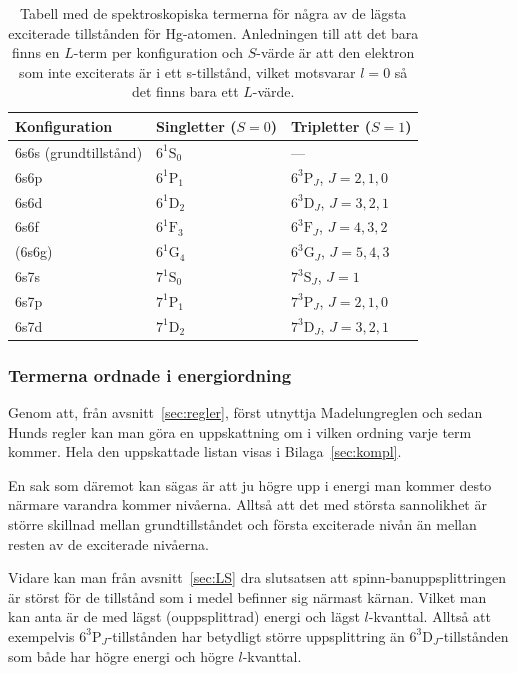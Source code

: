 \documentclass[11pt,a4paper]{article}
\begin{document}
\begin{table}
\centering
\caption{Tabell med de spektroskopiska termerna för några av de lägsta
exciterade tillstånden för Hg-atomen. Anledningen till att det bara
finns en $L$-term per konfiguration och $S$-värde är att den elektron
som inte exciterats är i ett s-tillstånd, vilket motsvarar $l=0$ så
det finns bara ett $L$-värde. }
\label{tab:Hg_termer}
\begin{tabular}{|l|l|l|}\hline
Konfiguration & Singletter ($S=0$) & Tripletter ($S=1$)
\\ \hline\hline
6s6s (grundtillstånd) & $6^1\mathrm{S}_0$ & --- \\ 
\hline
6s6p & $6^1\mathrm{P}_1$ & $6^3\mathrm{P}_J$, $J=2, 1, 0$ \\
6s6d & $6^1\mathrm{D}_2$ & $6^3\mathrm{D}_J$, $J=3, 2, 1$ \\
6s6f & $6^1\mathrm{F}_3$ & $6^3\mathrm{F}_J$, $J=4, 3, 2$ \\
(6s6g) & $6^1\mathrm{G}_4$ & $6^3\mathrm{G}_J$, $J=5, 4, 3$ \\
\hline
6s7s & $7^1\mathrm{S}_0$ & $7^3\mathrm{S}_J$, $J=1$ \\
6s7p & $7^1\mathrm{P}_1$ & $7^3\mathrm{P}_J$, $J=2, 1, 0$ \\
6s7d & $7^1\mathrm{D}_2$ & $7^3\mathrm{D}_J$, $J=3, 2, 1$ \\ 
\hline

\end{tabular}
\end{table}

\subsubsection{Termerna ordnade i energiordning}
Genom att, från avsnitt~\ref{sec:regler}, först utnyttja Madelungreglen och sedan Hunds regler kan man göra en uppskattning om i vilken ordning varje term kommer.
Hela den uppskattade listan visas i Bilaga~\ref{sec:kompl}. 

En sak som däremot kan sägas är att ju högre upp i energi man kommer desto närmare varandra kommer nivåerna. Alltså att det med största sannolikhet är större skillnad mellan grundtillståndet och första exciterade nivån än mellan resten av de exciterade nivåerna. 

Vidare kan man från avsnitt~\ref{sec:LS} dra slutsatsen att spinn-banuppsplittringen är störst för de tillstånd som i medel befinner sig närmast kärnan. Vilket man kan anta är de med lägst (ouppsplittrad) energi och lägst $l$-kvanttal.\footnotemark{} Alltså att exempelvis $6^3\mathrm{P}_J$-tillstånden har betydligt större uppsplittring än $6^3\mathrm{D}_J$-tillstånden som både har högre energi och högre $l$-kvanttal. 
\end{document}

